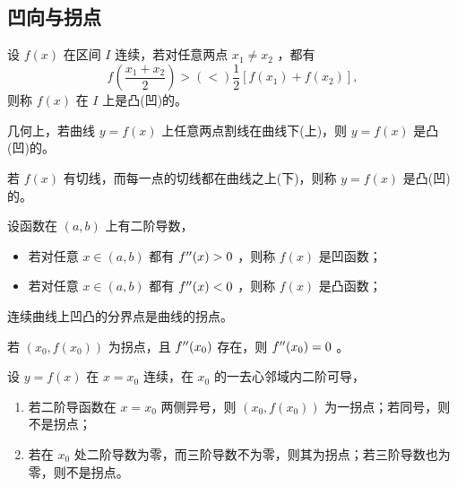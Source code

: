 \subsection{凹向与拐点}

\begin{Def}[凹凸性]

    设 $ f(x) $ 在区间 $ I $ 连续，若对任意两点 $ x_1 \neq x_2 $ ，都有$$
        f(\frac{x_1+x_2}{2})>(<)\frac{1}{2}[f(x_1)+f(x_2)],
    $$ 则称 $ f(x) $ 在 $ I $ 上是凸(凹)的。
\end{Def}

几何上，若曲线 $ y=f(x) $ 上任意两点割线在曲线下(上)，则 $ y=f(x) $ 是凸(凹)的。

若 $ f(x) $ 有切线，而每一点的切线都在曲线之上(下)，则称 $ y=f(x) $ 是凸(凹)的。

\begin{Theo}[凹凸判定定理]

    设函数在 $ (a,b) $ 上有二阶导数，\begin{itemize}
        \item 若对任意 $ x\in (a,b) $ 都有 $ f^{\prime\prime}(x)>0 $ ，则称 $ f(x) $ 是凹函数；
        \item 若对任意 $ x\in (a,b) $ 都有 $ f^{\prime\prime}(x)<0 $ ，则称 $ f(x) $ 是凸函数；
    \end{itemize}
\end{Theo}

\begin{Def}[拐点]

    连续曲线上凹凸的分界点是曲线的拐点。
\end{Def}

\begin{Theo}[二阶可导点为拐点的必要条件]

    若 $ (x_0,f(x_0)) $ 为拐点，且 $ f^{\prime\prime}(x_0) $ 存在，则 $ f^{\prime\prime}(x_0)=0 $ 。
\end{Theo}

\begin{Theo}[二阶可导点为拐点的充分条件]

    设 $ y=f(x) $ 在 $ x=x_0 $ 连续，在 $ x_0 $ 的一去心邻域内二阶可导，\begin{enumerate}
        \item 若二阶导函数在 $ x=x_0 $ 两侧异号，则 $ (x_0,f(x_0)) $ 为一拐点；若同号，则不是拐点；
        \item 若在 $ x_0 $ 处二阶导数为零，而三阶导数不为零，则其为拐点；若三阶导数也为零，则不是拐点。
    \end{enumerate}
\end{Theo}

